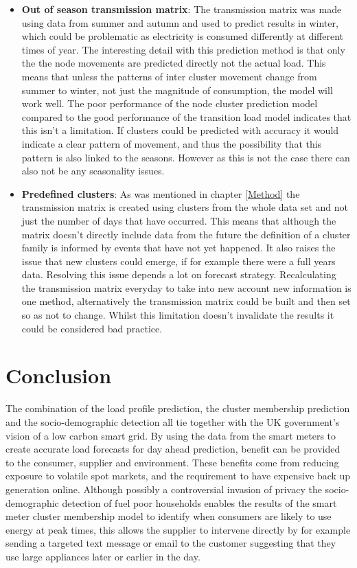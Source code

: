 \begin{itemize}
    \item \textbf{Out of season transmission matrix}: The transmission matrix was made using data from summer and autumn and used to predict results in winter, which could be problematic as electricity is consumed differently at different times of year. The interesting detail with this prediction method is that only the the node movements are predicted directly not the actual load. This means that unless the patterns of inter cluster movement change from summer to winter, not just the magnitude of consumption, the model will work well. The poor performance of the node cluster prediction model compared to the good performance of the transition load model indicates that this isn't a limitation. If clusters could be predicted with accuracy it would indicate a clear pattern of movement, and thus the possibility that this pattern is also linked to the seasons. However as this is not the case there can also not be any seasonality issues.
    
    \item \textbf{Predefined clusters}: As was mentioned in chapter \ref{Method} the transmission matrix is created using clusters from the whole data set and not just the number of days that have occurred. This means that although the matrix doesn't directly include data from the future the definition of a cluster family is informed by events that have not yet happened. It also raises the issue that new clusters could emerge, if for example there were a full years data. Resolving this issue depends a lot on forecast strategy. Recalculating the transmission matrix everyday to take into new account new information is one method, alternatively the transmission matrix could be built and then set so as not to change. Whilst this limitation doesn't invalidate the results it could be considered bad practice.
    
    \end{itemize}


\section{Conclusion}

The combination of the load profile prediction, the cluster membership prediction and the socio-demographic detection all tie together with the UK government's vision of a low carbon smart grid. By using the data from the smart meters to create accurate load forecasts for day ahead prediction, benefit can be provided to the consumer, supplier and environment. These benefits come from reducing exposure to volatile spot markets, and the requirement to have expensive back up generation online. Although possibly a controversial invasion of privacy the socio-demographic detection of fuel poor households enables the results of the smart meter cluster membership model to identify when consumers are likely to use energy at peak times, this allows the supplier to intervene directly by for example sending a targeted text message or email to the customer suggesting that they use large appliances later or earlier in the day. 

